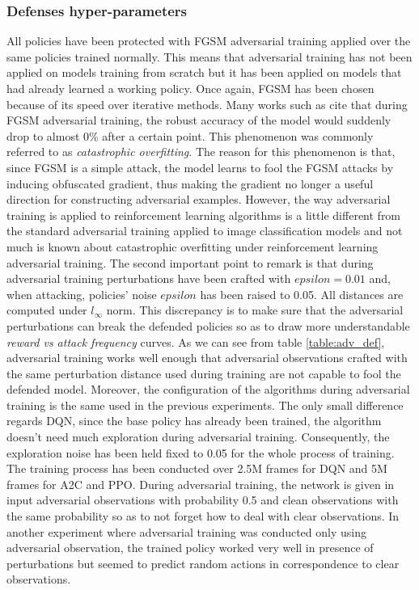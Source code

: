\subsubsection{Defenses hyper-parameters}
\label{sec:exp2-params}
All policies have been protected with FGSM adversarial training applied over the same policies trained normally. This means that adversarial training has not been applied on models training from scratch but it has been applied on models that had already learned a working policy. Once again, FGSM has been chosen because of its speed over iterative methods. Many works such as \cite{li2020understanding} cite that during FGSM adversarial training, the robust accuracy of the model would suddenly drop to almost 0\% after a certain point. This phenomenon was commonly referred to as {\it catastrophic overfitting}. The reason for this phenomenon is that, since FGSM is a simple attack, the model learns to fool the FGSM attacks by inducing obfuscated gradient, thus making the gradient no longer a useful direction for constructing adversarial examples. However, the way adversarial training is applied to reinforcement learning algorithms is a little different from the standard adversarial training applied to image classification models and not much is known about catastrophic overfitting under reinforcement learning adversarial training. The second important point to remark is that during adversarial training perturbations have been crafted with \(epsilon=0.01\) and, when attacking, policies' noise \(epsilon\) has been raised to 0.05. All distances are computed under \(l_\infty\) norm. This discrepancy is to make sure that the adversarial perturbations can break the defended policies so as to draw more understandable {\it reward vs attack frequency} curves. As we can see from table \ref{table:adv_def}, adversarial training works well enough that adversarial observations crafted with the same perturbation distance used during training are not capable to fool the defended model. Moreover, the configuration of the algorithms during adversarial training is the same used in the previous experiments. The only small difference regards DQN, since the base policy has already been trained, the algorithm doesn't need much exploration during adversarial training. Consequently, the exploration noise has been held fixed to 0.05 for the whole process of training. The training process has been conducted over 2.5M frames for DQN and 5M frames for A2C and PPO. During adversarial training, the network is given in input adversarial observations with probability 0.5 and clean observations with the same probability so as to not forget how to deal with clear observations. In another experiment where adversarial training was conducted only using adversarial observation, the trained policy worked very well in presence of perturbations but seemed to predict random actions in correspondence to clear observations.

